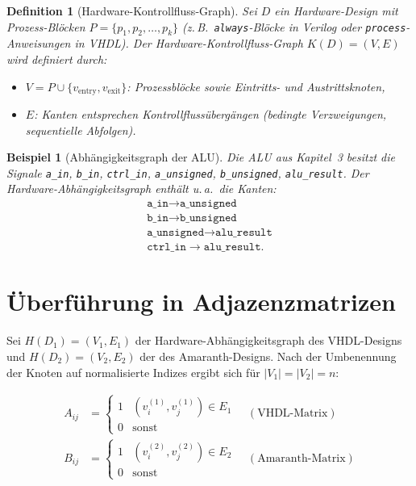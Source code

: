 ﻿\documentclass[12pt,a4paper]{report}
\newtheorem{definition}{Definition}[section]
\newtheorem{beispiel}{Beispiel}[section]
\begin{document}
\begin{definition}[Hardware-Kontrollfluss-Graph]
\label{def:hcfg}
Sei $D$ ein Hardware-Design mit Prozess-Blöcken $P = \{p_1, p_2, \ldots, p_k\}$ (z.\,B.\ \texttt{always}-Blöcke in Verilog oder \texttt{process}-Anweisungen in VHDL). Der \emph{Hardware-Kontrollfluss-Graph} $K(D) = (V, E)$ wird definiert durch:
\begin{itemize}
    \item $V = P \cup \{v_{\mathrm{entry}}, v_{\mathrm{exit}}\}$: Prozessblöcke sowie Eintritts- und Austrittsknoten,
    \item $E$: Kanten entsprechen Kontrollflussübergängen (bedingte Verzweigungen, sequentielle Abfolgen).
\end{itemize}
\end{definition}

\begin{beispiel}[Abhängigkeitsgraph der ALU]
\label{bsp:alu_graph}
Die ALU aus Kapitel~3 besitzt die Signale \texttt{a\_in}, \texttt{b\_in}, \texttt{ctrl\_in}, \texttt{a\_unsigned}, \texttt{b\_unsigned}, \texttt{alu\_result}. Der Hardware-Abhängigkeits\-graph enthält u.\,a.\ die Kanten:
\begin{align}
	\texttt{a\_in} \to \texttt{a\_unsigned} \\ \texttt{b\_in} \to \texttt{b\_unsigned} \\ \texttt{a\_unsigned} \to \texttt{alu\_result} \\ \texttt{ctrl\_in} \to \texttt{alu\_result}.	
\end{align}

\end{beispiel}

\section{Überführung in Adjazenzmatrizen}

Sei $H(D_1) = (V_1, E_1)$ der Hardware-Abhängigkeitsgraph des VHDL-Designs und $H(D_2) = (V_2, E_2)$ der des Amaranth-Designs. Nach der Umbenennung der Knoten auf normalisierte Indizes ergibt sich für $|V_1| = |V_2| = n$:

\begin{align*}
A_{ij} &= \begin{cases} 1 & (v_i^{(1)}, v_j^{(1)}) \in E_1 \\ 0 & \text{sonst} \end{cases}
\quad (\text{VHDL-Matrix})\\
B_{ij} &= \begin{cases} 1 & (v_i^{(2)}, v_j^{(2)}) \in E_2 \\ 0 & \text{sonst} \end{cases}
\quad (\text{Amaranth-Matrix})
\end{align*}
\end{document}
